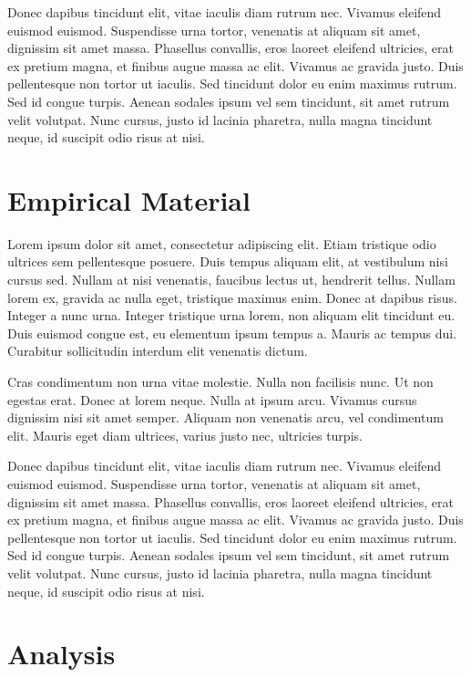 \documentclass[11pt, a4paper]{resources/JTH}
\begin{document}
Donec dapibus tincidunt elit, vitae iaculis diam rutrum nec. Vivamus eleifend euismod euismod. Suspendisse urna tortor, venenatis at aliquam sit amet, dignissim sit amet massa. Phasellus convallis, eros laoreet eleifend ultricies, erat ex pretium magna, et finibus augue massa ac elit. Vivamus ac gravida justo. Duis pellentesque non tortor ut iaculis. Sed tincidunt dolor eu enim maximus rutrum. Sed id congue turpis. Aenean sodales ipsum vel sem tincidunt, sit amet rutrum velit volutpat. Nunc cursus, justo id lacinia pharetra, nulla magna tincidunt neque, id suscipit odio risus at nisi.

\chapter{Empirical Material}
\label{chap:EmpiricalMaterial}

Lorem ipsum dolor sit amet, consectetur adipiscing elit. Etiam tristique odio ultrices sem pellentesque posuere. Duis tempus aliquam elit, at vestibulum nisi cursus sed. Nullam at nisi venenatis, faucibus lectus ut, hendrerit tellus. Nullam lorem ex, gravida ac nulla eget, tristique maximus enim. Donec at dapibus risus. Integer a nunc urna. Integer tristique urna lorem, non aliquam elit tincidunt eu. Duis euismod congue est, eu elementum ipsum tempus a. Mauris ac tempus dui. Curabitur sollicitudin interdum elit venenatis dictum.

Cras condimentum non urna vitae molestie. Nulla non facilisis nunc. Ut non egestas erat. Donec at lorem neque. Nulla at ipsum arcu. Vivamus cursus dignissim nisi sit amet semper. Aliquam non venenatis arcu, vel condimentum elit. Mauris eget diam ultrices, varius justo nec, ultricies turpis.

Donec dapibus tincidunt elit, vitae iaculis diam rutrum nec. Vivamus eleifend euismod euismod. Suspendisse urna tortor, venenatis at aliquam sit amet, dignissim sit amet massa. Phasellus convallis, eros laoreet eleifend ultricies, erat ex pretium magna, et finibus augue massa ac elit. Vivamus ac gravida justo. Duis pellentesque non tortor ut iaculis. Sed tincidunt dolor eu enim maximus rutrum. Sed id congue turpis. Aenean sodales ipsum vel sem tincidunt, sit amet rutrum velit volutpat. Nunc cursus, justo id lacinia pharetra, nulla magna tincidunt neque, id suscipit odio risus at nisi.

\chapter{Analysis}
\label{chap:Analysis}
\end{document}
